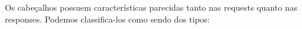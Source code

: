 Os cabeçalhos possuem características parecidas tanto nas requests quanto nas responses. Podemos classifica-los como sendo dos tipos: